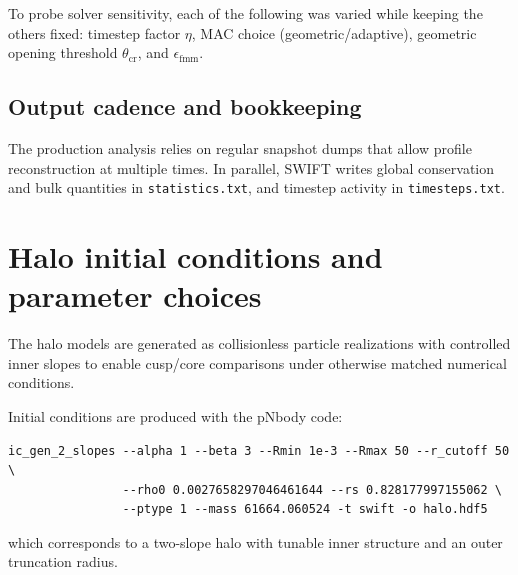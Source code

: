 To probe solver sensitivity, each of the following was varied while keeping the others fixed: timestep factor $\eta$, MAC choice (geometric/adaptive), geometric opening threshold $\theta_{\mathrm{cr}}$, and $\epsilon_{\mathrm{fmm}}$.

\subsection{Output cadence and bookkeeping}

The production analysis relies on regular snapshot dumps that allow profile reconstruction at multiple times. In parallel, SWIFT writes global conservation and bulk quantities in \texttt{statistics.txt}, and timestep activity in \texttt{timesteps.txt}.

\section{Halo initial conditions and parameter choices}
\label{sec:framework_ic_params}

The halo models are generated as collisionless particle realizations with controlled inner slopes to enable cusp/core comparisons under otherwise matched numerical conditions.

Initial conditions are produced with the pNbody code:
\begin{verbatim}
ic_gen_2_slopes --alpha 1 --beta 3 --Rmin 1e-3 --Rmax 50 --r_cutoff 50 \
				--rho0 0.0027658297046461644 --rs 0.828177997155062 \
				--ptype 1 --mass 61664.060524 -t swift -o halo.hdf5
\end{verbatim}
which corresponds to a two-slope halo with tunable inner structure and an outer truncation radius.

